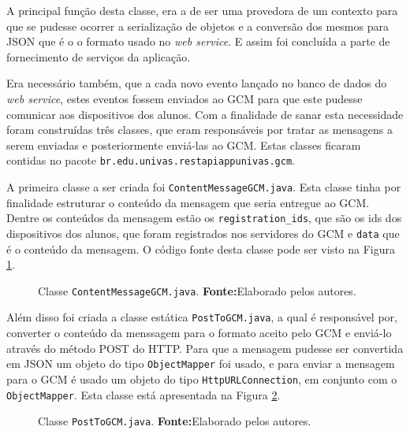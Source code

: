 	
	\par A principal função desta classe, era a de ser uma provedora de um contexto
para que se pudesse ocorrer a serialização de objetos e a conversão dos mesmos
para JSON que é o o formato usado no \textit{web service}. E assim foi
concluída a parte de fornecimento de serviços da aplicação.
	
	\par Era necessário também, que a cada novo evento lançado no banco de dados do
\textit{web service}, estes eventos fossem enviados ao GCM para que este pudesse
comunicar aos dispositivos dos alunos. Com a finalidade de sanar esta
necessidade foram construídas três classes, que eram responsáveis por tratar as
mensagens a serem enviadas e posteriormente enviá-las ao GCM. Estas classes
ficaram contidas no pacote \texttt{br.edu.univas.restapiappunivas.gcm}. 

	\par A primeira classe a ser criada foi \texttt{ContentMessageGCM.java}. Esta
classe tinha por finalidade estruturar o conteúdo da mensagem que seria
entregue ao GCM. Dentre os conteúdos da mensagem estão os
\texttt{registration\_ids}, que são os ids dos dispositivos dos alunos, que
foram registrados nos servidores do GCM e \texttt{data} que é o conteúdo da
mensagem. O código fonte desta classe pode ser visto na Figura
\ref{fig:desws30}.

	\begin{figure}[h!]
		
		\caption[Classe ContentMessageGCM.java]{Classe
		\texttt{ContentMessageGCM.java}.
		\textbf{Fonte:}Elaborado pelos autores.}
		\label{fig:desws30}
	\end{figure}

	\pagebreak
	
	\par Além disso foi criada a classe estática \texttt{PostToGCM.java}, a qual
é responsável por, converter o conteúdo da menssagem para o formato aceito
pelo GCM e enviá-lo através do método POST do HTTP. Para que a mensagem pudesse
ser convertida em JSON um objeto do tipo \texttt{ObjectMapper} foi usado, e
para enviar a mensagem para o GCM é usado um objeto do tipo
\texttt{HttpURLConnection}, em conjunto com o \texttt{ObjectMapper}. Esta classe
está apresentada na Figura \ref{fig:desws31}.

	\begin{figure}[h!]
		
		\caption[Classe PostToGCM.java]{Classe \texttt{PostToGCM.java}.
		\textbf{Fonte:}Elaborado pelos autores.}
		\label{fig:desws31}
	\end{figure}
	
